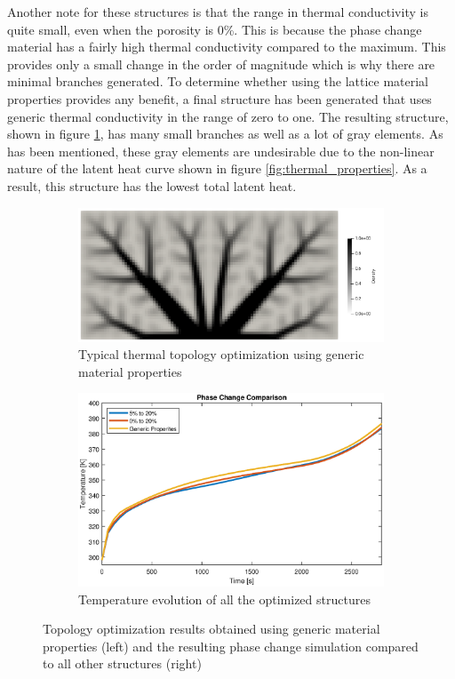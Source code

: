 Another note for these structures is that the range in thermal conductivity is quite small, even when the porosity is 0\%. This is because the phase change material has a fairly high thermal conductivity compared to the maximum. This provides only a small change in the order of magnitude which is why there are minimal branches generated. To determine whether using the lattice material properties provides any benefit, a final structure has been generated that uses generic thermal conductivity in the range of zero to one. The resulting structure, shown in figure \ref{fig:thermal_opt_generic}, has many small branches as well as a lot of gray elements. As has been mentioned, these gray elements are undesirable due to the non-linear nature of the latent heat curve shown in figure \ref{fig:thermal_properties}. As a result, this structure has the lowest total latent heat.
\begin{figure}[ht]
  \centering
  \begin{subfigure}{0.45\linewidth}
    \includegraphics[width=\linewidth]{figures/chapter_4/ThermalOptGeneric.png}
    \caption{Typical thermal topology optimization using generic material properties}
    \label{fig:thermal_opt_generic}
  \end{subfigure}
  \hfill
  \begin{subfigure}{0.5\linewidth}
    \includegraphics[width=\linewidth]{figures/chapter_4/PhaseChangeComparisonLatticeGeneric.eps}
    \caption{Temperature evolution of all the optimized structures}
    \label{fig:phase_change_lattice_generic}
  \end{subfigure}
  \caption{Topology optimization results obtained using generic material properties (left) and the resulting phase change simulation compared to all other structures (right)}
\end{figure}
  
